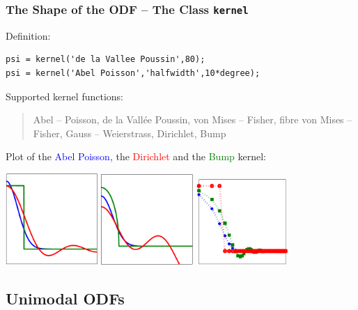 \begin{frame}[fragile]
  \frametitle{The Shape of the ODF -- The \MTEX Class \texttt{\bf kernel}}

Definition:

\begin{lstlisting}
psi = kernel('de la Vallee Poussin',80);
psi = kernel('Abel Poisson','halfwidth',10*degree);
\end{lstlisting}

\medskip

Supported kernel functions:

\begin{quote}
  Abel -- Poisson, de la Vall\'ee Poussin, von Mises -- Fisher, fibre von Mises
  -- Fisher, Gauss -- Weierstrass, Dirichlet, Bump
\end{quote}

Plot of the \textcolor{blue}{Abel Poisson}, the \textcolor{red}{Dirichlet} and
the \textcolor{green}{Bump} kernel:

\begin{center}
  \includegraphics[width=3.5cm]{pic/K} \quad
  \includegraphics[width=3.5cm]{pic/RK} \quad
  \includegraphics[width=3.5cm]{pic/Fourier}
\end{center}

\end{frame}

\subsection*{Unimodal ODFs}

